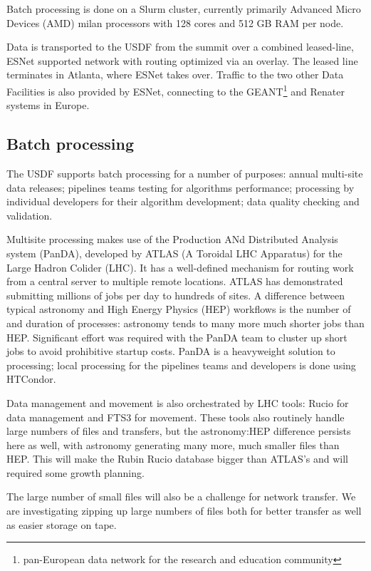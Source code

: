 Batch processing is done on a Slurm cluster, currently primarily Advanced Micro Devices (AMD) milan
processors with 128 cores and 512 GB RAM per node.

Data is transported to the USDF from the summit over a combined
leased-line, ESNet supported network with routing optimized via an
overlay. The leased line terminates in Atlanta, where ESNet takes
over. Traffic to the two other Data Facilities is also provided by
ESNet, connecting to the GEANT\footnote{pan-European data network for the research and education community}
 and Renater systems in Europe.

\subsection{Batch processing}

The USDF supports batch processing for a number of purposes: annual
multi-site data releases; pipelines teams testing for algorithms
performance; processing by individual developers for their algorithm
development; data quality checking and validation.

Multisite processing makes use of the Production ANd Distributed Analysis system (PanDA), developed
by ATLAS (A Toroidal LHC Apparatus) for the Large Hadron Colider (LHC).
It has a well-defined mechanism for routing work
from a central server to multiple remote locations. ATLAS has
demonstrated submitting millions of jobs per day to hundreds of sites.
A difference between typical astronomy and High Energy Physics (HEP) workflows is the
number of and duration of processes: astronomy tends to many more much
shorter jobs than HEP. Significant effort was required with the PanDA
team to cluster up short jobs to avoid prohibitive startup costs.
PanDA is a heavyweight solution to processing; local processing for
the pipelines teams and developers is done using HTCondor.

Data management and movement is also orchestrated by LHC tools: Rucio
for data management and FTS3 for movement. These tools also routinely
handle large numbers of files and transfers, but the astronomy:HEP
difference persists here as well, with astronomy generating many more,
much smaller files than HEP. This will make the Rubin Rucio database
bigger than ATLAS's and will required some growth planning.

The large number of small files will also be a challenge for network
transfer. We are investigating zipping up large numbers of files both
for better transfer as well as easier storage on tape.


